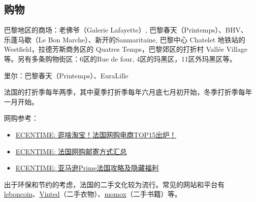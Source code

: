 \subsection{购物}

巴黎地区的商场：老佛爷（Galerie Lafayette）, 巴黎春天（Printemps）、BHV、乐蓬马歇（Le Bon Marche）、新开的Sanmaritaine, 巴黎中心 Chatelet 地铁站的Westfield，拉德芳斯商务区的 Quatres Temps，巴黎郊区的打折村 Vallée Village等。另有多条购物街区：6区的Rue de four, 4区的玛黑区，11区外玛黑区等。

里尔：巴黎春天（Printemps）、EuraLille

法国的打折季每年两季，其中夏季打折季每年六月底七月初开始，冬季打折季每年一月开始。

网购参考：
\begin{itemize}
    \item \href{https://www.ecentime.com/article/ecommerce-fr-top15}{ECENTIME: 逛啥淘宝！法国网购电商TOP15出炉！}
    \item \href{https://www.ecentime.com/article/online-shopping-delivery}{ECENTIME: 法国网购邮寄方式汇总}
    \item \href{https://www.ecentime.com/article/amazon-fr-skill-1}{ECENTIME: 亚马逊Prime法国攻略及隐藏福利}
\end{itemize}

出于环保和节约的考虑，法国的二手文化较为流行。常见的网站和平台有\href{https://www.leboncoin.fr/}{leboncoin}、\href{https://www.vinted.fr/}{Vinted}（二手衣物）、\href{https://www.momox-shop.fr/}{momox}（二手书籍）等。
